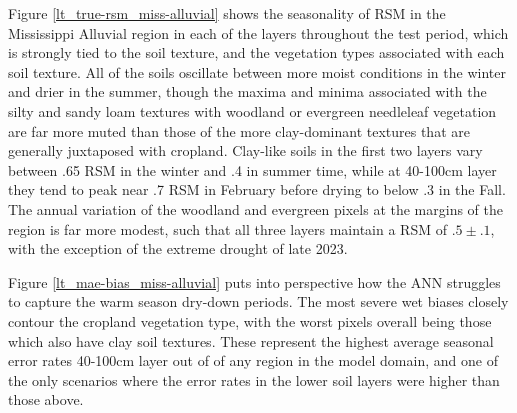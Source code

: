 Figure \ref{lt_true-rsm_miss-alluvial} shows the seasonality of RSM in the Mississippi Alluvial region in each of the layers throughout the test period, which is strongly tied to the soil texture, and the vegetation types associated with each soil texture. All of the soils oscillate between more moist conditions in the winter and drier in the summer, though the maxima and minima associated with the silty and sandy loam textures with woodland or evergreen needleleaf vegetation are far more muted than those of the more clay-dominant textures that are generally juxtaposed with cropland. Clay-like soils in the first two layers vary between .65 RSM in the winter and .4 in summer time, while at 40-100cm layer they tend to peak near .7 RSM in February before drying to below .3 in the Fall. The annual variation of the woodland and evergreen pixels at the margins of the region is far more modest, such that all three layers maintain a RSM of $.5\pm.1$, with the exception of the extreme drought of late 2023.

%
%

Figure \ref{lt_mae-bias_miss-alluvial} puts into perspective how the ANN struggles to capture the warm season dry-down periods. The most severe wet biases closely contour the cropland vegetation type, with the worst pixels overall being those which also have clay soil textures. These represent the highest average seasonal error rates 40-100cm layer out of of any region in the model domain, and one of the only scenarios where the error rates in the lower soil layers were higher than those above.

